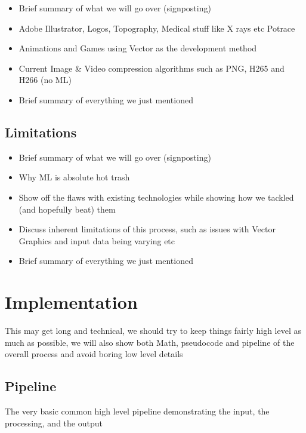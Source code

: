 \documentclass[12pt]{article}
\begin{document}
    \begin{itemize}
        \item Brief summary of what we will go over (signposting)
        \item Adobe Illustrator, Logos, Topography, Medical stuff like X rays etc Potrace
        \item Animations and Games using Vector as the development method
        \item Current Image \& Video compression algorithms such as PNG, H265 and H266 (no ML)
        \item Brief summary of everything we just mentioned
    \end{itemize}

    \subsection{Limitations}

    \begin{itemize}
        \item Brief summary of what we will go over (signposting)
        \item Why ML is absolute hot trash
        \item Show off the flaws with existing technologies while showing how we tackled (and hopefully beat) them
        \item Discuss inherent limitations of this process, such as issues with Vector Graphics and input data being varying etc
        \item Brief summary of everything we just mentioned
    \end{itemize}

    \pagebreak


    \section{Implementation}

    This may get long and technical, we should try to keep things fairly high level as much as possible,
    we will also show both Math, pseudocode and pipeline of the overall process and avoid boring low level details

    \subsection{Pipeline}

    The very basic common high level pipeline demonstrating the input, the processing, and the output
\end{document}
